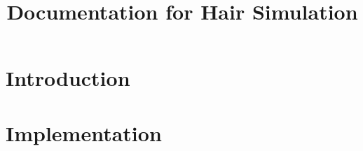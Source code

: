 \documentclass[11pt,a4paper]{scrartcl}
\title{Documentation for Hair Simulation}
\author{}
\begin{document}
\maketitle
\tableofcontents
\newpage

\section{Introduction}


\section{Implementation}
\end{document}
